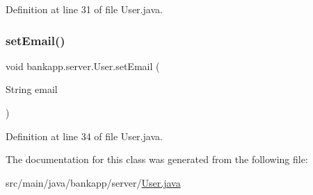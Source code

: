 Definition at line 31 of file User.\+java.

\mbox{\label{classbankapp_1_1server_1_1_user_aef6765beb0d9556f38070c919ca7e732}} 
\subsubsection{\texorpdfstring{set\+Email()}{setEmail()}}
{\footnotesize\ttfamily void bankapp.\+server.\+User.\+set\+Email (\begin{DoxyParamCaption}\item[{String}]{email }\end{DoxyParamCaption})}



Definition at line 34 of file User.\+java.



The documentation for this class was generated from the following file\+:\begin{DoxyCompactItemize}
\item 
src/main/java/bankapp/server/\hyperlink{_user_8java}{User.\+java}\end{DoxyCompactItemize}
